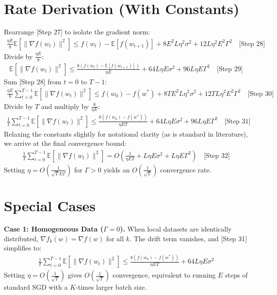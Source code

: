 \documentclass{article}
\begin{document}
\section*{Rate Derivation (With Constants)}
Rearrange [Step 27] to isolate the gradient norm:
\begin{align}
\frac{\eta E}{8} \mathbb{E}[\|\nabla f(w_t)\|^2] \leq f(w_t) - \mathbb{E}[f(w_{t+1})] + 8 E^2 L \eta^2 \sigma^2 + 12 L \eta^2 E^2 \Gamma^2 \quad \text{[Step 28]}
\end{align}
Divide by $\frac{\eta E}{8}$:
\begin{align}
\mathbb{E}[\|\nabla f(w_t)\|^2] \leq \frac{8(f(w_t) - \mathbb{E}[f(w_{t+1})])}{\eta E} + 64 L \eta E \sigma^2 + 96 L \eta E \Gamma^2 \quad \text{[Step 29]}
\end{align}
Sum [Step 28] from $t=0$ to $T-1$:
\begin{align}
\frac{\eta E}{8} \sum_{t=0}^{T-1} \mathbb{E}[\|\nabla f(w_t)\|^2] \leq f(w_0) - f(w^*) + 8 T E^2 L \eta^2 \sigma^2 + 12 T L \eta^2 E^2 \Gamma^2 \quad \text{[Step 30]}
\end{align}
Divide by $T$ and multiply by $\frac{8}{\eta E}$:
\begin{align}
\frac{1}{T} \sum_{t=0}^{T-1} \mathbb{E}[\|\nabla f(w_t)\|^2] \leq \frac{8(f(w_0) - f(w^*))}{\eta E T} + 64 L \eta E \sigma^2 + 96 L \eta E \Gamma^2 \quad \text{[Step 31]}
\end{align}
Relaxing the constants slightly for notational clarity (as is standard in literature), we arrive at the final convergence bound:
\begin{align}
\frac{1}{T} \sum_{t=0}^{T-1} \mathbb{E}[\|\nabla f(w_t)\|^2] = O\left( \frac{1}{\eta E T} + L \eta E \sigma^2 + L \eta E \Gamma^2 \right) \quad \text{[Step 32]}
\end{align}
Setting $\eta = O\left(\frac{1}{\sqrt{T} E \Gamma}\right)$ for $\Gamma > 0$ yields an $O\left(\frac{1}{\sqrt{T}}\right)$ convergence rate.

\section*{Special Cases}
\textbf{Case 1: Homogeneous Data ($\Gamma = 0$).} When local datasets are identically distributed, $\nabla f_k(w) = \nabla f(w)$ for all $k$. The drift term vanishes, and [Step 31] simplifies to:
\begin{align*}
\frac{1}{T} \sum_{t=0}^{T-1} \mathbb{E}[\|\nabla f(w_t)\|^2] \leq \frac{8(f(w_0) - f(w^*))}{\eta E T} + 64 L \eta E \sigma^2
\end{align*}
Setting $\eta = O(\frac{1}{\sqrt{T}})$ gives $O(\frac{1}{\sqrt{T}})$ convergence, equivalent to running $E$ steps of standard SGD with a $K$-times larger batch size.
\end{document}
